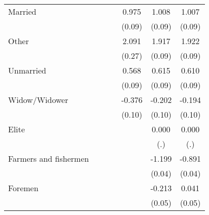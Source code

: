 {\begin{tabular}{l*{6}{c}}
Married             &                     &                     &                     &       0.975\sym{***}&       1.008\sym{***}&       1.007\sym{***}\\
                    &                     &                     &                     &      (0.09)         &      (0.09)         &      (0.09)         \\
Other               &                     &                     &                     &       2.091\sym{***}&       1.917\sym{***}&       1.922\sym{***}\\
                    &                     &                     &                     &      (0.27)         &      (0.09)         &      (0.09)         \\
Unmarried           &                     &                     &                     &       0.568\sym{***}&       0.615\sym{***}&       0.610\sym{***}\\
                    &                     &                     &                     &      (0.09)         &      (0.09)         &      (0.09)         \\
Widow/Widower       &                     &                     &                     &      -0.376\sym{***}&      -0.202\sym{*}  &      -0.194         \\
                    &                     &                     &                     &      (0.10)         &      (0.10)         &      (0.10)         \\
Elite               &                     &                     &                     &                     &       0.000         &       0.000         \\
                    &                     &                     &                     &                     &         (.)         &         (.)         \\
Farmers and fishermen&                     &                     &                     &                     &      -1.199\sym{***}&      -0.891\sym{***}\\
                    &                     &                     &                     &                     &      (0.04)         &      (0.04)         \\
Foremen             &                     &                     &                     &                     &      -0.213\sym{***}&       0.041         \\
                    &                     &                     &                     &                     &      (0.05)         &      (0.05)         \\

\end{tabular}}
